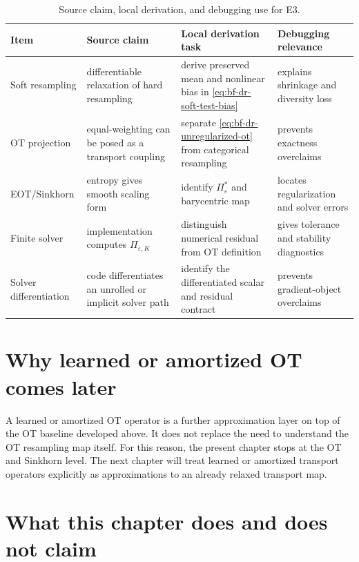 \begin{table}[ht]
\centering
\small
\begin{tabular}{p{} p{} p{} p{}}
\toprule
Item & Source claim & Local derivation task & Debugging relevance \\
\midrule
Soft resampling & differentiable relaxation of hard resampling & derive preserved mean and nonlinear bias in \eqref{eq:bf-dr-soft-test-bias} & explains shrinkage and diversity loss \\
OT projection & equal-weighting can be posed as a transport coupling & separate \eqref{eq:bf-dr-unregularized-ot} from categorical resampling & prevents exactness overclaims \\
EOT/Sinkhorn & entropy gives smooth scaling form & identify $\Pi_\varepsilon^*$ and barycentric map & locates regularization and solver errors \\
Finite solver & implementation computes $\Pi_{\varepsilon,K}$ & distinguish numerical residual from OT definition & gives tolerance and stability diagnostics \\
Solver differentiation & code differentiates an unrolled or implicit solver path & identify the differentiated scalar and residual contract & prevents gradient-object overclaims \\
\bottomrule
\end{tabular}
\caption{Source claim, local derivation, and debugging use for E3.}
\label{tab:bf-dr-source-claim-map}
\end{table}

\FloatBarrier

\section{Why learned or amortized OT comes later}
\label{sec:bf-dr-why-learned-later}

A learned or amortized OT operator is a further approximation layer on top of
the OT baseline developed above.  It does not replace the need to understand the
OT resampling map itself.  For this reason, the present chapter stops at the OT
and Sinkhorn level.  The next chapter will treat learned or amortized transport
operators explicitly as approximations to an already relaxed transport map.

\section{What this chapter does and does not claim}
\label{sec:bf-dr-chapter-boundary}


